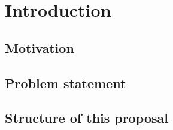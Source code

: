 
\section{Introduction}
\label{sec:introduction}


\subsection{Motivation}
\label{sec:motivation}


\subsection{Problem statement}
\label{sec:problem}


\subsection{Structure of this proposal}
\label{sec:structure}

